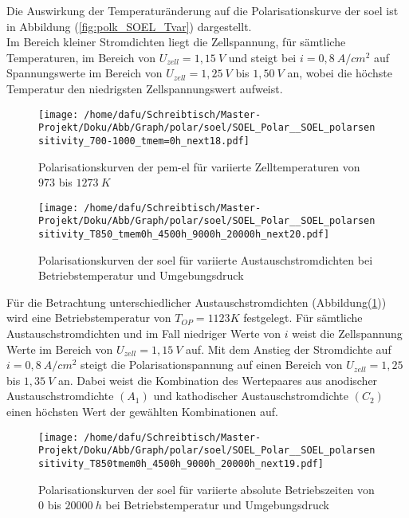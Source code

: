 \documentclass[onecolumn,10pt,titlepage]{article}
\begin{document}
Die Auswirkung der Temperaturänderung auf die Polarisationskurve der \gls{soel} ist in Abbildung (\ref{fig:polk_SOEL_Tvar}) dargestellt.\\
Im Bereich kleiner Stromdichten liegt die Zellspannung, für sämtliche Temperaturen, im Bereich von $U_{zell}=1,15~V$ und steigt bei $i=0,8~A/cm^2$ auf Spannungswerte im Bereich von $U_{zell}=1,25~V$ bis $1,50~V$ an, wobei die höchste Temperatur den niedrigsten Zellspannungswert aufweist.\\
\begin{figure}[H]
	\centering
	\begin{minipage}[t]{0.49\textwidth}
		\texttt{[image: /home/dafu/Schreibtisch/Master-Projekt/Doku/Abb/Graph/polar/soel/SOEL\_Polar\_\_SOEL\_polarsensitivity\_700-1000\_tmem=0h\_next18.pdf]}

		\caption[Polarisationskurven der \gls{pem}-\gls{el} für variierte Zelltemperaturen]{Polarisationskurven der \gls{pem}-\gls{el} für variierte Zelltemperaturen von $973$ bis $1273~K$}
		\label{fig:polk_SOEL_Tvar}
	\end{minipage}
	\hfill
	\begin{minipage}[t]{0.49\textwidth}
		\texttt{[image: /home/dafu/Schreibtisch/Master-Projekt/Doku/Abb/Graph/polar/soel/SOEL\_Polar\_\_SOEL\_polarsensitivity\_T850\_tmem0h\_4500h\_9000h\_20000h\_next20.pdf]}

		\caption[Polarisationskurven der \gls{soel} für variierte Austauschstromdichten]{Polarisationskurven der \gls{soel} für variierte Austauschstromdichten bei Betriebstemperatur und Umgebungsdruck}
		\label{fig:polk_SOEL_i0var}
	\end{minipage}
\end{figure}
Für die Betrachtung unterschiedlicher Austauschstromdichten (Abbildung(\ref{fig:polk_SOEL_i0var})) wird eine Betriebstemperatur von $T_{OP}=1123K$ festgelegt. Für sämtliche Austauschstromdichten und  im Fall niedriger Werte von $i$ weist die Zellspannung Werte im Bereich von $U_{zell}=1,15~V$ auf. Mit dem Anstieg der Stromdichte auf $i=0,8~A/cm^2$ steigt die Polarisationspannung auf einen Bereich von $U_{zell}=1,25$ bis $1,35~V$ an. Dabei weist die Kombination des Wertepaares aus anodischer Austauschstromdichte $(A_1)$ und kathodischer Austauschstromdichte $(C_2)$ einen höchsten Wert der gewählten Kombinationen auf.
\begin{figure}[H]

	\centering
	\texttt{[image: /home/dafu/Schreibtisch/Master-Projekt/Doku/Abb/Graph/polar/soel/SOEL\_Polar\_\_SOEL\_polarsensitivity\_T850tmem0h\_4500h\_9000h\_20000h\_next19.pdf]}
	\caption[Polarisationskurven der \gls{soel} für variierte absolute Betriebszeiten]{Polarisationskurven der \gls{soel} für variierte absolute Betriebszeiten von $0$ bis $20000~h$ bei Betriebstemperatur und Umgebungsdruck}
	\label{fig:polk_SOEL_tmemvar}
\end{figure}
\end{document}
